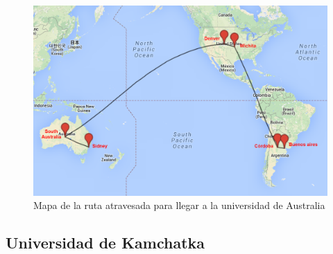 \begin{figure}[H]
	\begin{center}
		  \includegraphics[scale=0.4]{../mapas/mapa_md.png}
		  \caption{Mapa de la ruta atravesada para llegar a la universidad de Australia}
		  \label{fig:contra1}
	\end{center}
\end{figure}

\subsection{Universidad de Kamchatka}

